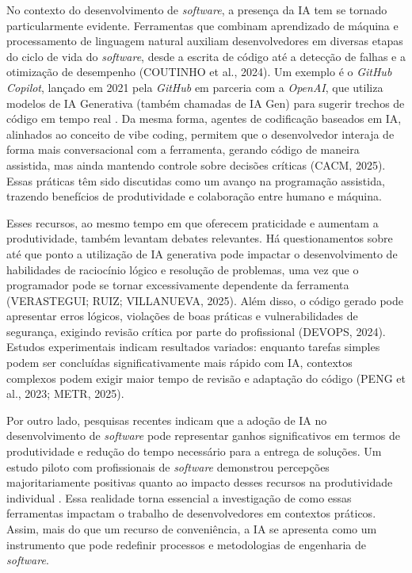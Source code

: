 \documentclass[english,brazilian]{UNISINOSartigo} %
\begin{document}
No contexto do desenvolvimento de \textit{software}, a presença da IA tem se tornado particularmente evidente. Ferramentas que combinam aprendizado de máquina e processamento de linguagem natural auxiliam desenvolvedores em diversas etapas do ciclo de vida do \textit{software}, desde a escrita de código até a detecção de falhas e a otimização de desempenho (COUTINHO et al., 2024). Um exemplo é o \textit{GitHub Copilot}, lançado em 2021 pela \textit{GitHub} em parceria com a \textit{OpenAI}, que utiliza modelos de IA Generativa (também chamadas de IA Gen) para sugerir trechos de código em tempo real \cite{github2021}. Da mesma forma, agentes de codificação baseados em IA, alinhados ao conceito de vibe coding, permitem que o desenvolvedor interaja de forma mais conversacional com a ferramenta, gerando código de maneira assistida, mas ainda mantendo controle sobre decisões críticas (CACM, 2025). Essas práticas têm sido discutidas como um avanço na programação assistida, trazendo benefícios de produtividade e colaboração entre humano e máquina.

Esses recursos, ao mesmo tempo em que oferecem praticidade e aumentam a produtividade, também levantam debates relevantes. Há questionamentos sobre até que ponto a utilização de IA generativa pode impactar o desenvolvimento de habilidades de raciocínio lógico e resolução de problemas, uma vez que o programador pode se tornar excessivamente dependente da ferramenta (VERASTEGUI; RUIZ; VILLANUEVA, 2025). Além disso, o código gerado pode apresentar erros lógicos, violações de boas práticas e vulnerabilidades de segurança, exigindo revisão crítica por parte do profissional (DEVOPS, 2024). Estudos experimentais indicam resultados variados: enquanto tarefas simples podem ser concluídas significativamente mais rápido com IA, contextos complexos podem exigir maior tempo de revisão e adaptação do código (PENG et al., 2023; METR, 2025).

Por outro lado, pesquisas recentes indicam que a adoção de IA no desenvolvimento de \textit{software} pode representar ganhos significativos em termos de produtividade e redução do tempo necessário para a entrega de soluções. Um estudo piloto com profissionais de \textit{software} demonstrou percepções majoritariamente positivas quanto ao impacto desses recursos na produtividade individual \cite{coutinho2024}. Essa realidade torna essencial a investigação de como essas ferramentas impactam o trabalho de desenvolvedores em contextos práticos. Assim, mais do que um recurso de conveniência, a IA se apresenta como um instrumento que pode redefinir processos e metodologias de engenharia de \textit{software}.
\end{document}
